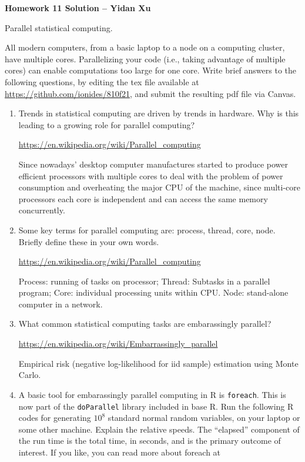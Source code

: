 \documentclass[12pt]{article}
\begin{document}
\begin{center}\bf
Homework 11 Solution -- Yidan Xu

Parallel statistical computing.

\end{center}

All modern computers, from a basic laptop to a node on a computing cluster, have multiple cores. Parallelizing your code (i.e., taking advantage of multiple cores) can enable computations too large for one core. Write brief answers to the following questions, by editing the tex file available at \url{https://github.com/ionides/810f21}, and submit the resulting pdf file via Canvas. 

\begin{enumerate}

\item Trends in statistical computing are driven by trends in hardware. Why is this leading to a growing role for parallel computing?

\url{https://en.wikipedia.org/wiki/Parallel_computing}

Since nowadays' desktop computer manufactures started to produce power efficient processors with multiple cores to deal with the problem of power consumption and overheating the major CPU of the machine, since multi-core processors each core is independent and can access the same memory concurrently.

\item Some key terms for parallel computing are: process, thread, core, node. Briefly define these in your own words.

\url{https://en.wikipedia.org/wiki/Parallel_computing}

Process: running of tasks on processor; Thread: Subtasks in a parallel program; Core: individual processing units within CPU. Node:  stand-alone computer in a network.
  
\item What common statistical computing tasks are embarassingly parallel?

\url{https://en.wikipedia.org/wiki/Embarrassingly_parallel}

Empirical risk (negative log-likelihood for iid sample) estimation using Monte Carlo.

\item A basic tool for embarassingly parallel computing in R is \texttt{foreach}. This is now part of the \texttt{doParallel} library included in base R. Run the following R codes for generating $10^8$ standard normal random variables, on your laptop or some other machine. Explain the relative speeds. The ``elapsed'' component of the run time is the total time, in seconds, and is the primary outcome of interest. If you like, you can read more about foreach at
  

\end{enumerate}
\end{document}
